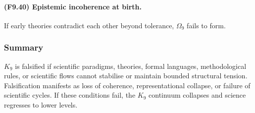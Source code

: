\paragraph{(F9.40) Epistemic incoherence at birth.}
If early theories contradict each other beyond tolerance,
$\Omega_9$ fails to form.



\subsubsection{Summary}

$K_9$ is falsified if scientific paradigms, theories, formal languages,
methodological rules, or scientific flows cannot stabilise or maintain
bounded structural tension. Falsification manifests as loss of
coherence, representational collapse, or failure of scientific cycles.
If these conditions fail, the $K_9$ continuum collapses and science
regresses to lower levels.
